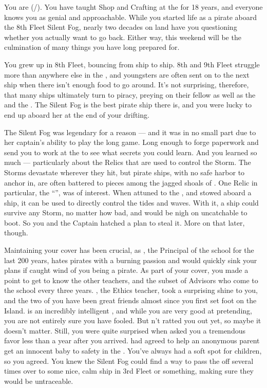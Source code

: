 \documentclass[char]{GL2020}
\begin{document}
\name{\cPirate{}}

You are \cPirate{\full} (\cPirate{\they}/\cPirate{\them}). You have taught Shop and Crafting at the \pSchool{} for 18 years, and everyone knows you as genial and approachable. While you started life as a pirate aboard the 8th Fleet Silent Fog, nearly two decades on land have you questioning whether you actually want to go back. Either way, this weekend will be the culmination of many things you have long prepared for.

You grew up in 8th Fleet, bouncing from ship to ship. 8th and 9th Fleet struggle more than anywhere else in the \pShip{}, and youngsters are often sent on to the next ship when there isn't enough food to go around. It's not surprising, therefore, that many ships ultimately turn to piracy, preying on their fellow \pShippies{} as well as the \pFarm{} and the \pTech{}. The Silent Fog is the best pirate ship there is, and you were lucky to end up aboard her at the end of your drifting.

The Silent Fog was legendary for a reason — and it was in no small part due to her captain's ability to play the long game. Long enough to forge paperwork and send you to work at the \pSchool{} to see what secrets you could learn. And you learned so much — particularly about the Relics that are used to control the Storm. The Storms devastate wherever they hit, but pirate ships, with no safe harbor to anchor in, are often battered to pieces among the jagged shoals of \pWod{}. One Relic in particular, the ``\iNet{}'', was of interest. When attuned to the \pShip{}, and stowed aboard a ship, it can be used to directly control the tides and waves. With it, a ship could survive any Storm, no matter how bad, and would be nigh on uncatchable to boot. So you and the Captain hatched a plan to steal it. More on that later, though.

Maintaining your cover has been crucial, as \cPrincipal{\full}, the Principal of the school for the last 200 years, hates pirates with a burning passion and would quickly sink your plans if \cPrincipal{\they} caught wind of you being a pirate. As part of your cover, you made a point to get to know the other teachers, and the subset of Advisors who come to the school every three years. \cEthics{\full}, the Ethics teacher, took a surprising shine to you, and the two of you have been great friends almost since you first set foot on the Island. \cEthics{} is an incredibly intelligent \cEthics{\person}, and while you are very good at pretending, you are not entirely sure you have \cEthics{\them} fooled. But \cEthics{\they} \cEthics{\have}n't ratted you out yet, so maybe it doesn't matter. Still, you were quite surprised when \cEthics{\they} asked you a tremendous favor less than a year after you arrived. \cEthics{} had agreed to help an anonymous parent get an innocent baby to safety in the \pShip{}. You've always had a soft spot for children, so you agreed. You knew the Silent Fog could find a way to pass the \cPirateChild{\child} off several times over to some nice, calm ship in 3rd Fleet or something, making sure they would be untraceable.
\end{document}
